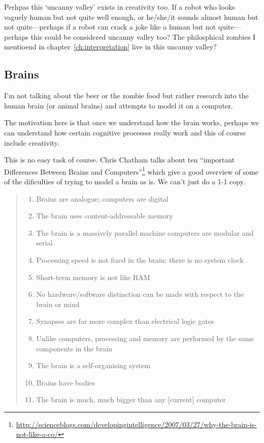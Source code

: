 Perhpas this `uncanny valley' exists in creativity too. If a robot who looks vaguely human but not quite well enough, or he/she/it sounds almost human but not quite---perhaps if a robot can crack a joke like a human but not quite---perhaps this could be considered uncanny valley too? The philosphical zombies I mentioend in chapter~\ref{ch:interpretation} live in this uncanny valley?



\subsection{Brains}

I'm not talking about the beer or the zombie food but rather research into the human brain (or animal brains) and attempts to model it on a computer. 

The motivation here is that once we understand how the brain works, perhaps we can understand how certain cognitive processes really work and this of course include creativity.

This is no easy task of course. Chris Chatham talks about ten ``important Differences Between Brains and Computers''\footnote{\url{http://scienceblogs.com/developingintelligence/2007/03/27/why-the-brain-is-not-like-a-co/}} which give a good overview of some of the dificulties of trying to model a brain as is. We can't just do a 1-1 copy.

\begin{quotation}
  \begin{enumerate}
    \item Brains are analogue; computers are digital
    \item The brain uses content-addressable memory
    \item The brain is a massively parallel machine computers are modular and serial
    \item Processing speed is not fixed in the brain; there is no system clock
    \item Short-term memory is not like RAM
    \item No hardware/software distinction can be made with respect to the brain or mind
    \item Synapses are far more complex than electrical logic gates
    \item Unlike computers, processing and memory are performed by the same components in the brain
    \item The brain is a self-organising system
    \item Brains have bodies
    \item	The brain is much, much bigger than any [current] computer
  \end{enumerate}
\end{quotation}

